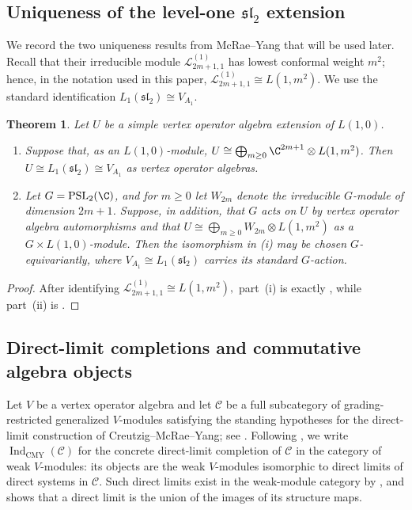 \documentclass[12pt,leqno]{amsart}
\numberwithin{equation}{section} \newtheorem{thm}{Theorem}[section] \newtheorem{lem}[thm]{Lemma} \newtheorem{ex}[thm]{Example} \newtheorem{prop}[thm]{Proposition} \newtheorem{cor}[thm]{Corollary} \newtheorem{defi}[thm]{Definition} \newtheorem{rmk}[thm]{Remark} \newtheorem{notation}[thm]{Notation}
\newcommand{\IndCMY}{\operatorname{Ind}_{\mathrm{CMY}}}
\newcommand{\PSLtwo}{\operatorname{PSL}_2(\C)}
\begin{document}
\subsection{Uniqueness of the level-one \texorpdfstring{$\mathfrak{sl}_2$}{sl2} extension}
\label{subsec:MY-L1-uniqueness}

We record the two uniqueness results from McRae--Yang \cite[Appendix~B]{MY} that will be used later. Recall that their irreducible module \(\mathcal L^{(1)}_{2m+1,1}\) has lowest conformal weight \(m^2\); hence, in the notation used in this paper, \(\mathcal L^{(1)}_{2m+1,1}\cong L(1,m^2).\) We use the standard identification \(L_1(\mathfrak{sl}_2)\cong V_{A_1}.\)
\begin{thm}
\label{thm:MY-L1-uniqueness}
Let \(U\) be a simple vertex operator algebra extension of \(L(1,0)\).
\begin{enumerate}[label=\textnormal{(\roman*)}]
\item
Suppose that, as an \(L(1,0)\)-module, \(U\cong\bigoplus_{m\ge0}\C^{2m+1}\otimes L(1,m^2)\). Then \(U\cong L_1(\mathfrak{sl}_2)\cong V_{A_1}\) as vertex operator algebras.

\item
Let \(G=\PSLtwo\), and for \(m\ge0\) let \(W_{2m}\) denote the irreducible \(G\)-module of dimension \(2m+1\). Suppose, in addition, that \(G\) acts on \(U\) by vertex operator algebra automorphisms and that \(U\cong\bigoplus_{m\ge0}W_{2m}\otimes L(1,m^2)\) as a \(G\times L(1,0)\)-module. Then the isomorphism in \textnormal{(i)} may be chosen \(G\)-equivariantly, where \(V_{A_1}\cong L_1(\mathfrak{sl}_2)\) carries its standard \(G\)-action.
\end{enumerate}
\end{thm}

\begin{proof}
After identifying \(\mathcal L^{(1)}_{2m+1,1}\cong L(1,m^2),\) part~\textnormal{(i)} is exactly \cite[Theorem~B.1]{MY}, while part~\textnormal{(ii)} is \cite[Theorem~B.2]{MY}.
\end{proof}

\subsection{Direct-limit completions and commutative algebra objects}

Let $V$ be a vertex operator algebra and let $\mathcal C$ be a full subcategory of grading-restricted generalized $V$-modules satisfying the standing hypotheses for the direct-limit construction of Creutzig--McRae--Yang; see \cite[Assumption~4.1]{CMY}. Following \cite[Definition~4.4]{CMY}, we write \(\IndCMY(\mathcal C)\) for the concrete direct-limit completion of $\mathcal C$ in the category of weak $V$-modules: its objects are the weak $V$-modules isomorphic to direct limits of direct systems in $\mathcal C$. Such direct limits exist in the weak-module category by \cite[Proposition~3.5]{CMY}, and \cite[Proposition~3.6]{CMY} shows that a direct limit is the union of the images of its structure maps.
\end{document}
